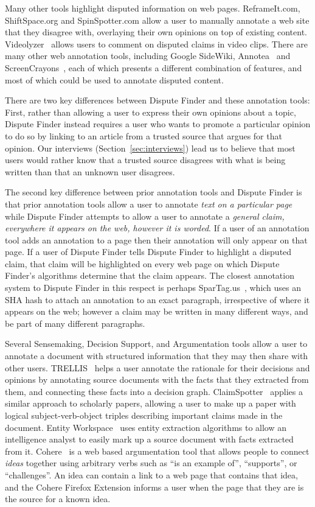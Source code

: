\documentclass{www2010-accepted}
\begin{document}
Many other tools highlight disputed information on web pages. ReframeIt.com, ShiftSpace.org and SpinSpotter.com allow a user to manually annotate a web site that they disagree with, overlaying their own opinions on top of existing content. Videolyzer~\cite{Diakopoulos2008} allows users to comment on disputed claims in video clips. There are many other web annotation tools, including Google SideWiki, Annotea~\cite{Koivunen2001} and ScreenCrayons~\cite{Olsen2004}, each of which presents a different combination of features, and most of which could be used to annotate disputed content.

There are two key differences between Dispute Finder and these annotation tools: First, rather than allowing a user to express their own opinions about a topic, Dispute Finder instead requires a user who wants to promote a particular opinion to do so by linking to an article from a trusted source that argues for that opinion. Our interviews (Section~\ref{sec:interviews}) lead us to believe that most users would rather know that a trusted source disagrees with what is being written than that an unknown user disagrees.

The second key difference between prior annotation tools and Dispute Finder is that prior annotation tools allow a user to annotate {\it text on a particular page} while Dispute Finder attempts to allow a user to annotate a {\it general claim, everywhere it appears on the web, however it is worded}. If a user of an annotation tool adds an annotation to a page then their annotation will only appear on that page. If a user of Dispute Finder tells Dispute Finder to highlight a disputed claim, that claim will be highlighted on every web page on which Dispute Finder's algorithms determine that the claim appears. The closest annotation system to Dispute Finder in this respect is perhaps SparTag.us~\cite{Hong2009}, which uses an SHA hash to attach an annotation to an exact paragraph, irrespective of where it appears on the web; however a claim may be written in many different ways, and be part of many different paragraphs.

Several Sensemaking, Decision Support, and Argumentation tools allow a user to annotate a document with structured information that they may then share with other users. TRELLIS~\cite{Gil2002} helps a user annotate the rationale for their decisions and opinions by annotating source documents with the facts that they extracted from them, and connecting these facts into a decision graph. ClaimSpotter~\cite{Sereno2005,Sereno2004} applies a similar approach to scholarly papers, allowing a user to make up a paper with logical subject-verb-object triples describing important claims made in the document. Entity Workspace~\cite{Bier2006} uses entity extraction algorithms to allow an intelligence analyst to easily mark up a source document with facts extracted from it. Cohere~\cite{Shum2008} is a web based argumentation tool that allows people to connect {\it ideas} together using arbitrary verbs such as ``is an example of'', ``supports'', or ``challenges''. An idea can contain a link to a web page that contains that idea, and the Cohere Firefox Extension informs a user when the page that they are is the source for a known idea.
\end{document}
